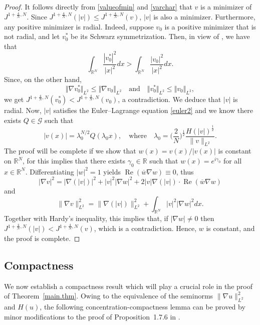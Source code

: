 \documentclass[reqno]{amsart}
\newcommand{\real}{\mathbb{R}}
\newcommand{\rn}{\real^N}
\newcommand{\intrn}{\int_{\real^N}}
\newcommand{\R}{\mathbb{R}}
\let\le=\leqslant
\DeclareMathOperator \re{Re}
\theoremstyle{plain}
\theoremstyle{definition}
\numberwithin{equation}{section}
\begin{document}
\begin{proof}
It follows directly from \eqref{valueofmin} and \eqref{varchar} that $v$ is a 
minimizer of $J^{1+\frac4N,N}$. Since $J^{1+\frac4N,N}(|v|)\le J^{1+\frac4N,N}(v)$,
$|v|$ is also a minimizer. Furthermore, any positive minimizer is radial. Indeed, suppose $v_0$ is a positive minimizer that is not radial,
and let $v_0^*$ be its Schwarz symmetrization. 
Then, in view of \cite[Theorem~3.4]{Lieb}, we have that
\[
\intrn \frac{|v_0^*|^{2}}{|x|^2} dx > \intrn \frac{|v_0|^{2}}{|x|^2} dx.
\]
Since, on the other hand,
\[
\Vert \nabla v_0^*\Vert_{L^2}\le \Vert \nabla v_0\Vert_{L^2}
\quad\text{and}\quad
\Vert v_0^*\Vert_{L^2}\le\Vert v_0\Vert_{L^2},
\]
we get $J^{1+\frac4N,N}(v_0^*)<J^{1+\frac4N,N}(v_0)$, a contradiction. We deduce that $|v|$ is radial. Now, 
$|v|$ satisfies the Euler--Lagrange equation \eqref{euler2} and we know
there exists $Q\in\mathcal{G}$ such that
\[
|v(x)|=\lambda_0^{N/2}Q(\lambda_0 x), \quad \text{where} \quad \lambda_0
=\Big(\frac{2}{N}\Big)^{\frac{1}{2}}\frac{H(|v|)^\frac{1}{2}}{\|v\|_{L^2}}.
\]
The proof will be complete if we show that $w(x)=v(x)/|v(x)|$ is constant on $\rn$, 
for this implies that there exists $\gamma_0\in\R$ such that 
$w(x)=e^{i\gamma_0}$ for all $x\in\rn$.
Differentiating $|w|^2=1$ yields $\re(\overline{w}\nabla w)\equiv 0$, thus
\[
|\nabla v|^2=|\nabla(|v|)|^2+|v|^2|\nabla w|^2+2|v|\nabla(|v|)\cdot \re(\overline{w}\nabla w)
\]
and
\[
\|\nabla v\|_{L^2}^2=\|\nabla (|v|)\|_{L^2}^2+\int_{\rn} |v|^2|\nabla w|^2dx.
\]
Together with Hardy's inequality, this implies that, if $|\nabla w|\neq 0$
then $J^{1+\frac4N,N}(|v|)< J^{1+\frac4N,N}(v)$, which is a contradiction. 
Hence, $w$ is constant, and the proof is complete.
\end{proof}


\subsection{Compactness} 

We now establish a compactness result which will play a crucial role 
in the proof of Theorem~\ref{main.thm}.
Owing to the equivalence of the seminorms $\|\nabla u\|_{L^2}^2$ and $H(u)$, 
the following concentration-compactness lemma can be proved 
by minor modifications to the proof of Proposition~1.7.6 in \cite{cazenave}.
\end{document}
